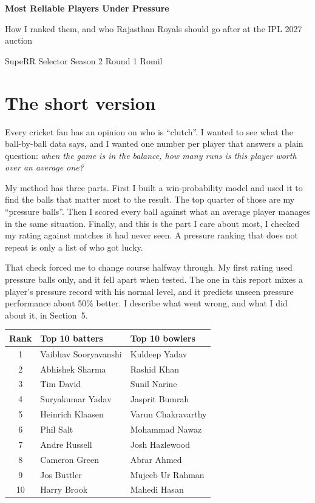 \documentclass[10.5pt,a4paper]{article}
\begin{document}
{\sffamily\bfseries\huge\color{accent} Most Reliable Players Under Pressure\par}
\vspace{2pt}
{\sffamily\large How I ranked them, and who Rajasthan Royals should go after at the IPL 2027 auction\par}
\vspace{4pt}
{\small SupeRR Selector Season 2 \textperiodcentered{} Round 1 \textperiodcentered{} Romil\par}

\section{The short version}

Every cricket fan has an opinion on who is ``clutch''. I wanted to see what the ball-by-ball data says, and I wanted one number per player that answers a plain question: \emph{when the game is in the balance, how many runs is this player worth over an average one?}

My method has three parts. First I built a win-probability model and used it to find the balls that matter most to the result. The top quarter of those are my ``pressure balls''. Then I scored every ball against what an average player manages in the same situation. Finally, and this is the part I care about most, I checked my rating against matches it had never seen. A pressure ranking that does not repeat is only a list of who got lucky.

That check forced me to change course halfway through. My first rating used pressure balls only, and it fell apart when tested. The one in this report mixes a player's pressure record with his normal level, and it predicts unseen pressure performance about 50\% better. I describe what went wrong, and what I did about it, in Section~5.

\begin{table}[H]\centering\small
\begin{tabular}{c l l}
\toprule
Rank & Top 10 batters & Top 10 bowlers\\
\midrule
1 & Vaibhav Sooryavanshi & Kuldeep Yadav \\
2 & Abhishek Sharma & Rashid Khan \\
3 & Tim David & Sunil Narine \\
4 & Suryakumar Yadav & Jasprit Bumrah \\
5 & Heinrich Klaasen & Varun Chakravarthy \\
6 & Phil Salt & Mohammad Nawaz \\
7 & Andre Russell & Josh Hazlewood \\
8 & Cameron Green & Abrar Ahmed \\
9 & Jos Buttler & Mujeeb Ur Rahman \\
10 & Harry Brook & Mahedi Hasan\\
\bottomrule
\end{tabular}
\end{table}
\end{document}
